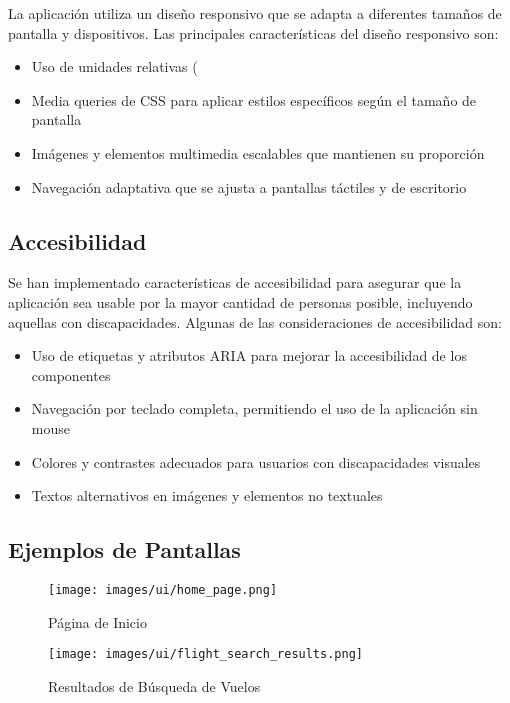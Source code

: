 \documentclass[12pt,a4paper]{article}
\begin{document}
La aplicación utiliza un diseño responsivo que se adapta a diferentes tamaños de pantalla y dispositivos. Las principales características del diseño responsivo son:

\begin{itemize}
    \item Uso de unidades relativas (%
    \item Media queries de CSS para aplicar estilos específicos según el tamaño de pantalla
    \item Imágenes y elementos multimedia escalables que mantienen su proporción
    \item Navegación adaptativa que se ajusta a pantallas táctiles y de escritorio
\end{itemize}

\subsection{Accesibilidad}

Se han implementado características de accesibilidad para asegurar que la aplicación sea usable por la mayor cantidad de personas posible, incluyendo aquellas con discapacidades. Algunas de las consideraciones de accesibilidad son:

\begin{itemize}
    \item Uso de etiquetas y atributos ARIA para mejorar la accesibilidad de los componentes
    \item Navegación por teclado completa, permitiendo el uso de la aplicación sin mouse
    \item Colores y contrastes adecuados para usuarios con discapacidades visuales
    \item Textos alternativos en imágenes y elementos no textuales
\end{itemize}

\subsection{Ejemplos de Pantallas}

\begin{figure}[H]
    \centering
    \texttt{[image: images/ui/home\_page.png]}
    \caption{Página de Inicio}
    \label{fig:pantalla_inicio}
\end{figure}

\begin{figure}[H]
    \centering
    \texttt{[image: images/ui/flight\_search\_results.png]}
    \caption{Resultados de Búsqueda de Vuelos}
    \label{fig:resultados_vuelos}
\end{figure}
\end{document}
